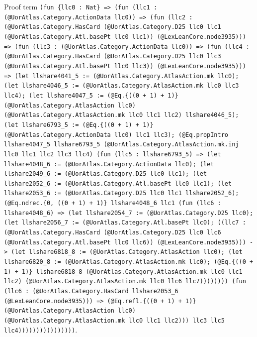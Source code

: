 \documentclass[11pt]{article}
\begin{document}
\noindent Proof term \texttt{(fun \{llc0 : Nat\} => (fun (llc1 : (@UorAtlas.Category.ActionData llc0)) => (fun (llc2 : (@UorAtlas.Category.HasCard (@UorAtlas.Category.D25 llc0 llc1 (@UorAtlas.Category.Atl.basePt llc0 llc1)) (@LexLeanCore.node3935))) => (fun (llc3 : (@UorAtlas.Category.ActionData llc0)) => (fun (llc4 : (@UorAtlas.Category.HasCard (@UorAtlas.Category.D25 llc0 llc3 (@UorAtlas.Category.Atl.basePt llc0 llc3)) (@LexLeanCore.node3935))) => (let llshare4041\_5 := (@UorAtlas.Category.AtlasAction.mk llc0); (let llshare4046\_5 := (@UorAtlas.Category.AtlasAction.mk llc0 llc3 llc4); (let llshare4047\_5 := (@Eq.\{((0 + 1) + 1)\} (@UorAtlas.Category.AtlasAction llc0) (@UorAtlas.Category.AtlasAction.mk llc0 llc1 llc2) llshare4046\_5); (let llshare6793\_5 := (@Eq.\{((0 + 1) + 1)\} (@UorAtlas.Category.ActionData llc0) llc1 llc3); (@Eq.propIntro llshare4047\_5 llshare6793\_5 (@UorAtlas.Category.AtlasAction.mk.inj llc0 llc1 llc2 llc3 llc4) (fun (llc5 : llshare6793\_5) => (let llshare4048\_6 := (@UorAtlas.Category.ActionData llc0); (let llshare2049\_6 := (@UorAtlas.Category.D25 llc0 llc1); (let llshare2052\_6 := (@UorAtlas.Category.Atl.basePt llc0 llc1); (let llshare2053\_6 := (@UorAtlas.Category.D25 llc0 llc1 llshare2052\_6); (@Eq.ndrec.\{0, ((0 + 1) + 1)\} llshare4048\_6 llc1 (fun (llc6 : llshare4048\_6) => (let llshare2054\_7 := (@UorAtlas.Category.D25 llc0); (let llshare2056\_7 := (@UorAtlas.Category.Atl.basePt llc0); ((llc7 : (@UorAtlas.Category.HasCard (@UorAtlas.Category.D25 llc0 llc6 (@UorAtlas.Category.Atl.basePt llc0 llc6)) (@LexLeanCore.node3935))) -> (let llshare6818\_8 := (@UorAtlas.Category.AtlasAction llc0); (let llshare6820\_8 := (@UorAtlas.Category.AtlasAction.mk llc0); (@Eq.\{((0 + 1) + 1)\} llshare6818\_8 (@UorAtlas.Category.AtlasAction.mk llc0 llc1 llc2) (@UorAtlas.Category.AtlasAction.mk llc0 llc6 llc7)))))))) (fun (llc6 : (@UorAtlas.Category.HasCard llshare2053\_6 (@LexLeanCore.node3935))) => (@Eq.refl.\{((0 + 1) + 1)\} (@UorAtlas.Category.AtlasAction llc0) (@UorAtlas.Category.AtlasAction.mk llc0 llc1 llc2))) llc3 llc5 llc4))))))))))))))))}.\par
\end{document}
